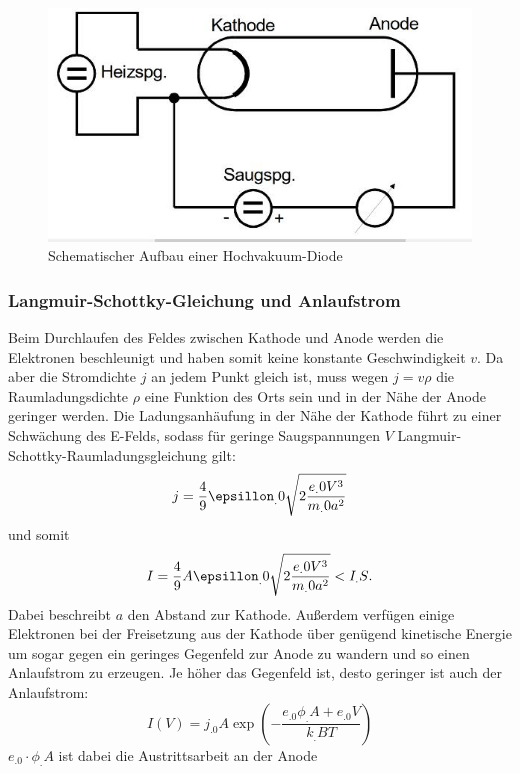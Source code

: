 \begin{figure}
\centering
\includegraphics[width=\linewidth-70pt,height=\textheight-70pt,keepaspectratio]{content/images/HVD.jpg}
\caption{Schematischer Aufbau einer Hochvakuum-Diode\cite{V504}
\label{fig:HVD}}
\end{figure}
\subsubsection{Langmuir-Schottky-Gleichung und Anlaufstrom}
Beim Durchlaufen des Feldes zwischen Kathode und Anode werden die Elektronen beschleunigt und haben somit keine konstante Geschwindigkeit $v$.
Da aber die Stromdichte $j$ an jedem Punkt gleich ist, muss wegen $j=v\rho$
die Raumladungsdichte $\rho$ eine Funktion des Orts sein und in der Nähe der Anode geringer werden. Die Ladungsanhäufung in der Nähe der Kathode führt zu einer Schwächung des E-Felds, sodass für geringe Saugspannungen $V$ Langmuir-Schottky-Raumladungsgleichung gilt:
\begin{equation*}
j = \frac{4}{9}\epsillon_.0\sqrt{2\frac{e_.0V^3}{m_.0a^2}}
\end{equation*}
und somit
\begin{equation}
I = \frac{4}{9}A\epsillon_.0\sqrt{2\frac{e_.0V^3}{m_.0a^2}}<I_.S\text{.}
\label{eq:langmuir}
\end{equation}
Dabei beschreibt $a$ den Abstand zur Kathode.
Außerdem verfügen einige Elektronen bei der Freisetzung aus der Kathode über genügend kinetische Energie um sogar gegen ein geringes Gegenfeld zur Anode zu wandern und so einen Anlaufstrom zu erzeugen.
Je höher das Gegenfeld ist, desto geringer ist auch der Anlaufstrom:
\begin{equation}
I(V)=j_.0A\exp{\left(-\frac{e_.0\phi_.A+e_.0V}{k_.B	T}\right)}
\label{eq:Anlauf}
\end{equation}
$e_.0\cdot\phi_.A$ ist dabei die Austrittsarbeit an der Anode
